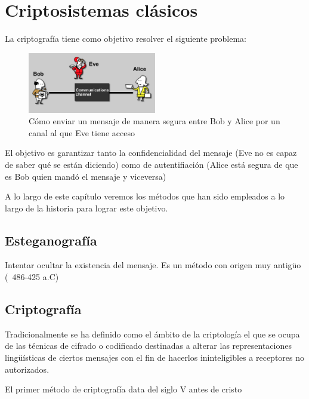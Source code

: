 \chapter{Criptosistemas clásicos}

La criptografía tiene como objetivo resolver el siguiente problema:

\begin{figure}[h]
	\begin{center}
		\includegraphics[width=0.5\textwidth]{img/aliceBobEve.png}
		\caption{Cómo enviar un mensaje de manera segura entre Bob y Alice por un canal al que Eve tiene acceso}
	\end{center}
\end{figure}


El objetivo es garantizar tanto la confidencialidad del mensaje (Eve no es capaz de saber qué se están diciendo) como de autentifiación (Alice está segura de que es Bob quien mandó el mensaje y viceversa)

A lo largo de este capítulo veremos los métodos que han sido empleados a lo largo de la historia para lograr este objetivo.

	\section{Esteganografía}

		Intentar ocultar la existencia del mensaje. Es un método con origen muy antigüo (~486-425 a.C)

	\section{Criptografía}
		\begin{defn}[Criptografía]
		Tradicionalmente se ha definido como el ámbito de la criptología el que se ocupa de las técnicas de cifrado o codificado destinadas a alterar las representaciones lingüísticas de ciertos mensajes con el fin de hacerlos ininteligibles a receptores no autorizados.

		El primer método de criptografía data del siglo V antes de cristo
		\end{defn}

